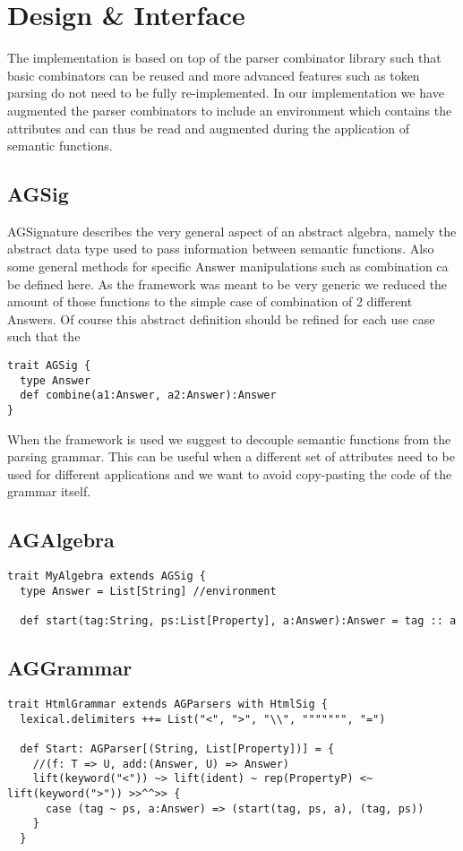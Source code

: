 \section{Design \& Interface}
The implementation is based on top of the parser combinator library such that basic combinators can be reused and more advanced features such as token parsing do not need to be fully re-implemented. In our implementation we have augmented the parser combinators to include an environment which contains the attributes and can thus be read and augmented during the application of semantic functions.

\subsection{AGSig}
AGSignature describes the very general aspect of an abstract algebra, namely the abstract data type used to pass information between semantic functions. Also some general methods for specific Answer manipulations such as combination ca be defined here. As the framework was meant to be very generic we reduced the amount of those functions to the simple case of combination of 2 different Answers. Of course this abstract definition should be refined for each use case such that the 
\begin{lstlisting}
trait AGSig {
  type Answer
  def combine(a1:Answer, a2:Answer):Answer
}
\end{lstlisting}

When the framework is used we suggest to decouple semantic functions from the parsing grammar. This can be useful when a different set of attributes need to be used for different applications and we want to avoid copy-pasting the code of the grammar itself. 

\subsection{AGAlgebra}
\begin{lstlisting}
trait MyAlgebra extends AGSig {
  type Answer = List[String] //environment

  def start(tag:String, ps:List[Property], a:Answer):Answer = tag :: a
\end{lstlisting}

\subsection{AGGrammar}
\begin{lstlisting}
trait HtmlGrammar extends AGParsers with HtmlSig {
  lexical.delimiters ++= List("<", ">", "\\", """"""", "=")

  def Start: AGParser[(String, List[Property])] = {
    //(f: T => U, add:(Answer, U) => Answer)
    lift(keyword("<")) ~> lift(ident) ~ rep(PropertyP) <~ lift(keyword(">")) >>^^>> {
      case (tag ~ ps, a:Answer) => (start(tag, ps, a), (tag, ps))
    }
  }
\end{lstlisting}

